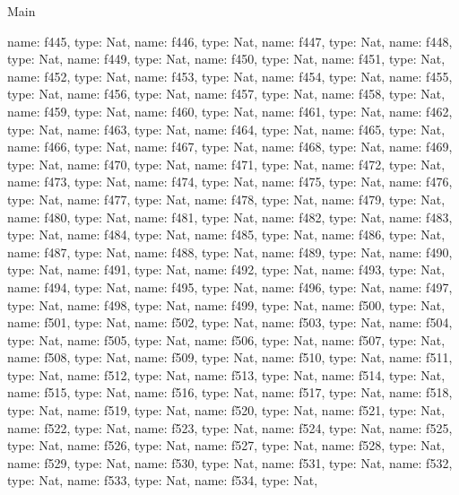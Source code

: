 \begin{lexlean}{Main}
\begin{semanticmodule}
{    {name: f445, type: Nat},
    {name: f446, type: Nat},
    {name: f447, type: Nat},
    {name: f448, type: Nat},
    {name: f449, type: Nat},
    {name: f450, type: Nat},
    {name: f451, type: Nat},
    {name: f452, type: Nat},
    {name: f453, type: Nat},
    {name: f454, type: Nat},
    {name: f455, type: Nat},
    {name: f456, type: Nat},
    {name: f457, type: Nat},
    {name: f458, type: Nat},
    {name: f459, type: Nat},
    {name: f460, type: Nat},
    {name: f461, type: Nat},
    {name: f462, type: Nat},
    {name: f463, type: Nat},
    {name: f464, type: Nat},
    {name: f465, type: Nat},
    {name: f466, type: Nat},
    {name: f467, type: Nat},
    {name: f468, type: Nat},
    {name: f469, type: Nat},
    {name: f470, type: Nat},
    {name: f471, type: Nat},
    {name: f472, type: Nat},
    {name: f473, type: Nat},
    {name: f474, type: Nat},
    {name: f475, type: Nat},
    {name: f476, type: Nat},
    {name: f477, type: Nat},
    {name: f478, type: Nat},
    {name: f479, type: Nat},
    {name: f480, type: Nat},
    {name: f481, type: Nat},
    {name: f482, type: Nat},
    {name: f483, type: Nat},
    {name: f484, type: Nat},
    {name: f485, type: Nat},
    {name: f486, type: Nat},
    {name: f487, type: Nat},
    {name: f488, type: Nat},
    {name: f489, type: Nat},
    {name: f490, type: Nat},
    {name: f491, type: Nat},
    {name: f492, type: Nat},
    {name: f493, type: Nat},
    {name: f494, type: Nat},
    {name: f495, type: Nat},
    {name: f496, type: Nat},
    {name: f497, type: Nat},
    {name: f498, type: Nat},
    {name: f499, type: Nat},
    {name: f500, type: Nat},
    {name: f501, type: Nat},
    {name: f502, type: Nat},
    {name: f503, type: Nat},
    {name: f504, type: Nat},
    {name: f505, type: Nat},
    {name: f506, type: Nat},
    {name: f507, type: Nat},
    {name: f508, type: Nat},
    {name: f509, type: Nat},
    {name: f510, type: Nat},
    {name: f511, type: Nat},
    {name: f512, type: Nat},
    {name: f513, type: Nat},
    {name: f514, type: Nat},
    {name: f515, type: Nat},
    {name: f516, type: Nat},
    {name: f517, type: Nat},
    {name: f518, type: Nat},
    {name: f519, type: Nat},
    {name: f520, type: Nat},
    {name: f521, type: Nat},
    {name: f522, type: Nat},
    {name: f523, type: Nat},
    {name: f524, type: Nat},
    {name: f525, type: Nat},
    {name: f526, type: Nat},
    {name: f527, type: Nat},
    {name: f528, type: Nat},
    {name: f529, type: Nat},
    {name: f530, type: Nat},
    {name: f531, type: Nat},
    {name: f532, type: Nat},
    {name: f533, type: Nat},
    {name: f534, type: Nat},
}
\end{semanticmodule}
\end{lexlean}
